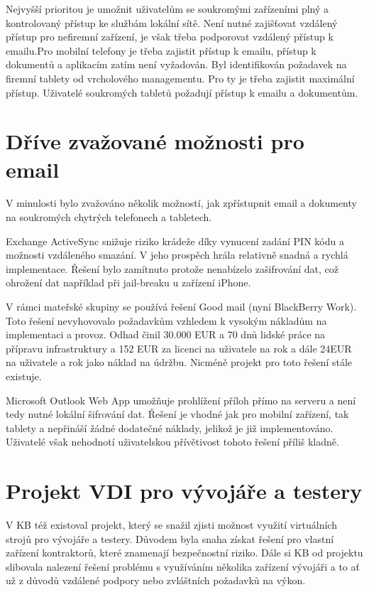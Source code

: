 Nejvyšší prioritou je umožnit uživatelům se soukromými zařízeními plný a kontrolovaný přístup ke službám lokální sítě. Není nutné zajišťovat vzdálený přístup pro nefiremní zařízení, je však třeba podporovat vzdálený přístup k emailu.Pro mobilní telefony je třeba zajistit přístup k emailu, přístup k dokumentů a aplikacím zatím není vyžadován. Byl identifikován požadavek na firemní tablety od vrcholového managementu. Pro ty je třeba zajistit maximální přístup. Uživatelé soukromých tabletů požadují přístup k emailu a dokumentům.

\section{Dříve zvažované možnosti pro email}
V minulosti bylo zvažováno několik možností, jak zpřístupnit email a dokumenty na soukromých chytrých telefonech a tabletech.

Exchange ActiveSync snižuje riziko krádeže díky vynucení zadání PIN kódu a možnosti vzdáleného smazání. V jeho prospěch hrála relativně snadná a rychlá implementace. Řešení bylo zamítnuto protože nenabízelo zašifrování dat, což ohrožení dat například při jail-breaku u zařízení iPhone.

V rámci mateřské skupiny se používá řešení Good mail (nyní BlackBerry Work). Toto řešení nevyhovovalo požadavkům vzhledem k vysokým nákladům na implementaci a provoz. Odhad činil 30.000 EUR a 70 dnů lidské práce na přípravu infrastruktury a 152 EUR za licenci na uživatele na rok a dále 24EUR na uživatele a rok jako náklad na údržbu. Nicméně projekt pro toto řešení stále existuje.

Microsoft Outlook Web App umožňuje prohlížení příloh přímo na serveru a není tedy nutné lokální šifrování dat. Řešení je vhodné jak pro mobilní zařízení, tak tablety a nepřináší žádné dodatečné náklady, jelikož je již implementováno. Uživatelé však nehodnotí uživatelskou přívětivost tohoto řešení příliš kladně.

\section{Projekt VDI pro vývojáře a testery}\label{projektVDI}

V KB též existoval projekt, který se snažil zjisti možnost využití virtuálních strojů pro vývojáře a testery. Důvodem byla snaha získat řešení pro vlastní zařízení kontraktorů, které znamenají bezpečnostní riziko. Dále si KB od projektu slibovala nalezení řešení problému s využíváním několika zařízení vývojáři a to ať už z důvodů vzdálené podpory nebo zvláštních požadavků na výkon.

